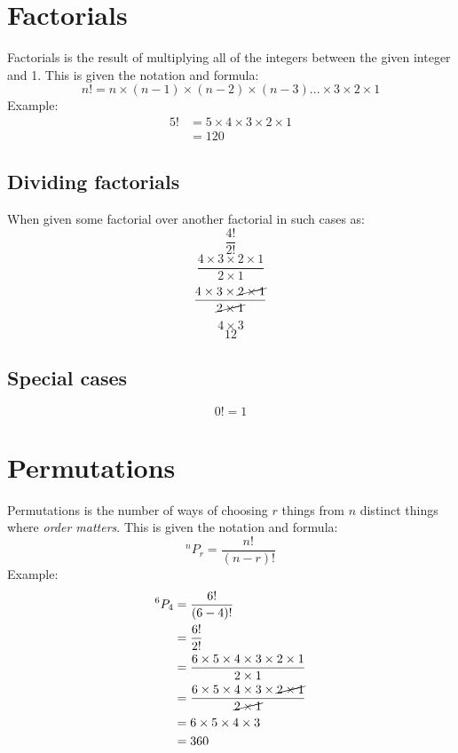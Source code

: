 \documentclass{book}
\begin{document}
\chapter{Factorials}
Factorials is the result of multiplying all of the integers between the given integer and 1.  This is given the notation and formula:
\[
	n! = n \times (n-1) \times (n-2) \times (n-3)... \times 3 \times 2 \times 1
\]
Example:\\
\begin{align*}
	5! & = 5 \times 4 \times 3 \times 2 \times 1 \\
	   & = 120
\end{align*}

\section{Dividing factorials}
When given some factorial over another factorial in such cases as:
\[\frac{4!}{2!}\]
\[\frac{4 \times 3 \times 2 \times 1}{2 \times 1}\]
\[\frac{4 \times 3 \times \cancel{2 \times 1}}{\cancel{2 \times 1}}\]
\[4 \times 3\]
\[12\]

\section{Special cases}
\[0! = 1\]

\chapter{Permutations}
Permutations is the number of ways of choosing $r$ things from $n$ distinct things where \emph{order matters}.  This is given the notation and formula:
\[
	^nP_r = \frac{n!}{(n-r)!}
\]
Example:
\begin{align*}
	^6P_4 & = \frac{6!}{(6 - 4)!}                                                                 \\
	      & = \frac{6!}{2!}                                                                       \\
	      & = \frac{6 \times 5 \times 4 \times 3 \times 2 \times 1}{2 \times 1}                   \\
	      & = \frac{6 \times 5 \times 4 \times 3 \times \cancel{2 \times 1}}{\cancel{2 \times 1}} \\
	      & = 6 \times 5 \times 4 \times 3                                                        \\
	      & = 360
\end{align*}
\end{document}
